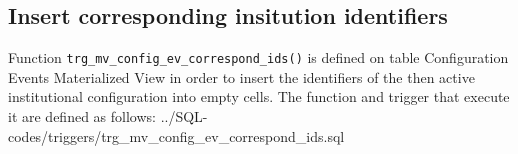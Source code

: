 \subsection{Insert corresponding insitution identifiers}\label{subsec_appx_fun_trg_mv_config_ev_correspond_ids}

Function \texttt{trg\_mv\_config\_ev\_correspond\_ids()} is defined on table Configuration Events Materialized View in order to insert the identifiers of the then active institutional configuration into empty cells.
The function and trigger that execute it are defined as follows:
%
{../SQL-codes/triggers/trg_mv_config_ev_correspond_ids.sql}
